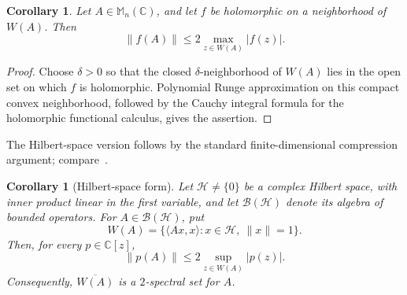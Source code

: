 \documentclass[preprints,article,submit,oneauthor]{Definitions/mdpi}
\newcounter{manuscriptresult}[section]
\theoremstyle{mdpi}
\newtheorem{corollary}[manuscriptresult]{Corollary}
\theoremstyle{definition}
\newcommand{\C}{\mathbb C}
\newcommand{\Mn}{\mathbb M_n(\C)}
\begin{document}
\begin{corollary}
\label{cor:holomorphic-bound}
Let $A\in\Mn$, and let $f$ be holomorphic on a neighborhood of
$W(A)$.  Then
\begin{equation}
  \lVert f(A)\rVert
  \leq2\max_{z\in W(A)}\lvert f(z)\rvert.
  \label{eq:holomorphic-bound}
\end{equation}
\end{corollary}

\begin{proof}
Choose $\delta>0$ so that the closed $\delta$-neighborhood of $W(A)$
lies in the open set on which $f$ is holomorphic.  Polynomial Runge
approximation on this compact convex neighborhood, followed by the
Cauchy integral formula for the holomorphic functional calculus, gives
the assertion.
\end{proof}

The Hilbert-space version follows by the standard finite-dimensional
compression argument; compare~\cite{BickelEtAl2020}.

\begin{corollary}[Hilbert-space form]
\label{cor:operator-bound}
Let $\mathcal H\neq\{0\}$ be a complex Hilbert space, with inner
product linear in the first variable, and let $\mathcal B(\mathcal H)$
denote its algebra of bounded operators.  For
$A\in\mathcal B(\mathcal H)$, put
\[
  W(A)=\{\langle Ax,x\rangle:x\in\mathcal H,\ \lVert x\rVert=1\}.
\]
Then, for every $p\in\C[z]$,
\begin{equation}
  \lVert p(A)\rVert
  \leq 2\sup_{z\in W(A)}\lvert p(z)\rvert.
  \label{eq:operator-polynomial-bound}
\end{equation}
Consequently, $\overline{W(A)}$ is a $2$-spectral set for $A$.
\end{corollary}
\end{document}
